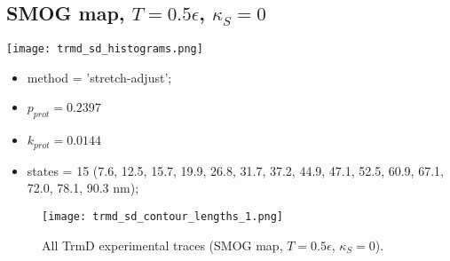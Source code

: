 \subsection{SMOG map, $T=0.5\epsilon$, $\kappa_S=0$}
\label{subsec:trmd-sd}
\begin{minipage}[c]{0.7\textwidth}
    \texttt{[image: trmd\_sd\_histograms.png]}
\end{minipage}
\hfill
\begin{minipage}[c]{0.45\textwidth}
    \begin{itemize}
        \item method = 'stretch-adjust';
        \item $p_{prot}=0.2397$
        \item $k_{prot}=0.0144$
        \item states = 15 (7.6, 12.5, 15.7, 19.9, 26.8, 31.7, 37.2, 44.9, 47.1, 52.5, 60.9, 67.1, 72.0, 78.1, 90.3 nm);
    \end{itemize}
\end{minipage}

\begin{figure}
    \centering
    \texttt{[image: trmd\_sd\_contour\_lengths\_1.png]}
    \caption{All TrmD experimental traces (SMOG map, $T=0.5\epsilon$, $\kappa_S=0$).}
    \label{fig:trmd-sd-cl1}
\end{figure}


